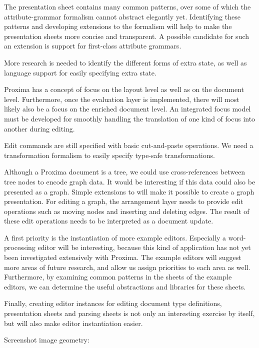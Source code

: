  The presentation sheet contains many common patterns, over some of which the attribute-grammar formalism cannot abstract elegantly yet. Identifying these patterns and developing extensions to the formalism will help  to make the presentation sheets more concise and transparent. A possible candidate for such an extension is support for first-class attribute grammars.

 More research is needed to identify the different forms of extra state, as well as language support for easily specifying extra state.

 Proxima has a concept of focus on the layout level as well as on the document level. Furthermore, once the evaluation layer is implemented, there will most likely also be a focus on the enriched document level. An integrated focus model must be developed for smoothly handling the translation of one kind of focus into another during editing.

 Edit commands are still specified with basic cut-and-paste operations. We need a transformation formalism to easily specify type-safe transformations.

 Although a Proxima document is a tree, we could use cross-references between tree nodes to encode graph data. It would be interesting if this data could also be presented as a graph. Simple extensions to {\Xprez} will make it possible to create a graph presentation. For editing a graph, the arrangement layer needs to provide edit operations such as moving nodes and inserting and deleting edges. The result of these edit operations needs to be interpreted as a document update.

\bigskip
A first priority is the instantiation of more example editors. Especially a word-processing editor will be interesting, because this kind of application has not yet been investigated extensively with Proxima. The example editors will suggest more areas of future research, and allow us assign priorities to each area as well. Furthermore, by examining common patterns in the sheets of the example editors, we can determine the useful abstractions and libraries for these sheets.

Finally, creating editor instances for editing document type definitions, presentation sheets and parsing sheets is not only an interesting exercise by itself, but will also make editor instantiation easier.



\bc

Screenshot image geometry:



\ec